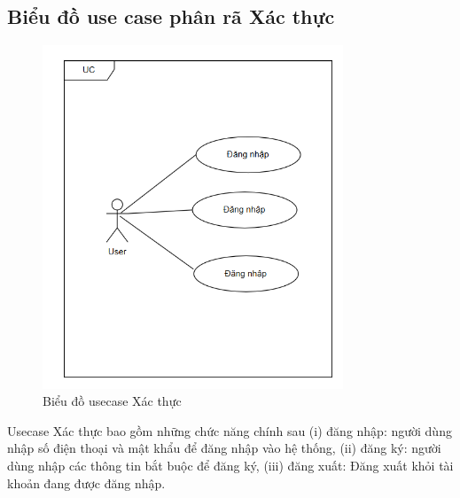 \documentclass[../DoAn.tex]{subfiles}
\begin{document}
\subsection{Biểu đồ use case phân rã Xác thực}
\label{subsection:2.2.2}
\begin{figure}[H]
  \centering
  \includegraphics[width=0.8\textwidth]{Hinhve/Usecase_xac_thuc.png}
  \caption{Biểu đồ usecase Xác thực}
  \label{fig:use_case_xac_thuc}
\end{figure}
Usecase Xác thực bao gồm những chức năng chính sau (i) đăng nhập: người dùng nhập số điện thoại và mật khẩu để đăng nhập vào hệ thống, (ii) đăng ký: người dùng nhập các thông tin bắt buộc để đăng ký, (iii) đăng xuất: Đăng xuất khỏi tài khoản đang được đăng nhập.
\end{document}
